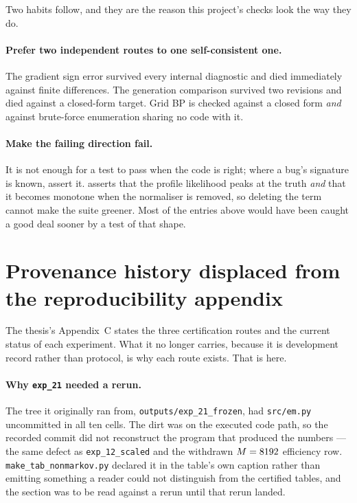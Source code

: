 Two habits follow, and they are the reason this project's checks look the way they do.

\paragraph{Prefer two independent routes to one self-consistent one.} The gradient sign error
survived every internal diagnostic and died immediately against finite differences. The
generation comparison survived two revisions and died against a closed-form target. Grid BP is
checked against a closed form \emph{and} against brute-force enumeration sharing no code with it.

\paragraph{Make the failing direction fail.} It is not enough for a test to pass when the code is
right; where a bug's signature is known, assert it.  asserts that
the profile likelihood peaks at the truth \emph{and} that it becomes monotone when the normaliser
is removed, so deleting the term cannot make the suite greener. Most of the entries above would
have been caught a good deal sooner by a test of that shape.

\section{Provenance history displaced from the reproducibility appendix}
\label{sec:provenance-history}

The thesis's Appendix~C states the three certification routes and the current
status of each experiment. What it no longer carries, because it is development
record rather than protocol, is why each route exists. That is here.

\paragraph{Why \texttt{exp\_21} needed a rerun.} The tree it originally ran
from, \texttt{outputs/exp\_21\_frozen}, had \texttt{src/em.py} uncommitted in
all ten cells. The dirt was on the executed code path, so the recorded commit
did not reconstruct the program that produced the numbers --- the same defect as
\texttt{exp\_12\_scaled} and the withdrawn $M = 8192$ efficiency row.
\texttt{make\_tab\_nonmarkov.py} declared it in the table's own caption rather
than emitting something a reader could not distinguish from the certified
tables, and the section was to be read against a rerun until that rerun landed.

